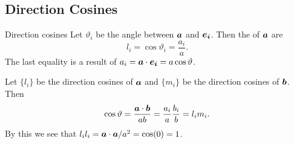 \subsection{Direction Cosines}
\begin{definition}{Direction cosines}{}
    Let \(\vartheta_i\) be the angle between \(\bm{a}\) and \(\bm{e_{i}}\).
    Then the  of \(\bm{a}\) are
    \[l_i = \cos\vartheta_i = \frac{a_i}{a}.\]
    The last equality is a result of \(a_i = \bm{a}\cdot\bm{e_{i}} = a\cos\vartheta\).
\end{definition}
Let \(\{l_i\}\) be the direction cosines of \(\bm{a}\) and \(\{m_i\}\) be the direction cosines of \(\bm{b}\).
Then
\[\cos\vartheta = \frac{\bm{a}\cdot\bm{b}}{ab} = \frac{a_i}{a}\frac{b_i}{b} = l_im_i.\]
By this we see that \(l_il_i = \bm{a}\cdot\bm{a} / a^2 = \cos(0) = 1\).

